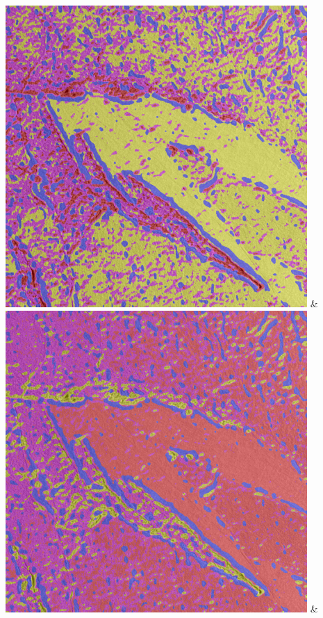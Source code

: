 \begin{table}[h!]
\begin{tabularx}{\textwidth}
		\includegraphics[width=0.9\linewidth]{images/gen/color_weight/p03_03.png_1.00.png} &
		\includegraphics[width=0.9\linewidth]{images/gen/color_weight/p03_03.png_1.33.png} &

\end{tabularx}
\end{table}
